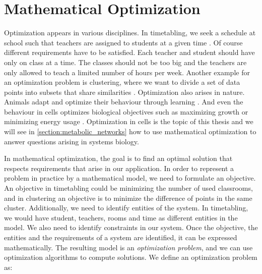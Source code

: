 \section{Mathematical Optimization} \label{section:optimization}
Optimization appears in various disciplines. 
In timetabling, we seek a schedule at school such that teachers are assigned to students at a given time \cite{timetabling}. Of course different requirements have to be satisfied. Each teacher and student should have only on class at a time. The classes should not be too big and the teachers are only allowed to teach a limited number of hours per week. 
Another example for an optimization problem is clustering, where we want to divide a set of data points into subsets that share similarities \cite{clustering}. 
Optimization also arises in nature. Animals adapt and optimize their behaviour through learning \cite{optimization_systems_biology}. And even the behaviour in cells optimizes biological objectives such as maximizing growth or minimizing energy usage \cite{intro_computational_systems_biology}. Optimization in cells is the topic of this thesis and we will see in \cref{section:metabolic_networks} how to use mathematical optimization to answer questions arising in systems biology.

In mathematical optimization, the goal is to find an optimal solution that respects requirements that arise in our application. In order to represent a problem in practice by a mathematical model, we need to formulate an objective. An objective in timetabling could be minimizing the number of used classrooms, and in clustering an objective is to minimize the difference of points in the same cluster. Additionally, we need to identify entities of the system. In timetabling, we would have student, teachers, rooms and time as different entities in the model. We also need to identify constraints in our system. Once the objective, the entities and the requirements of a system are identified, it can be expressed mathematically.
The resulting model is an \textit{optimization problem}, and we can use optimization algorithms to compute solutions. 
We define an optimization problem as:

